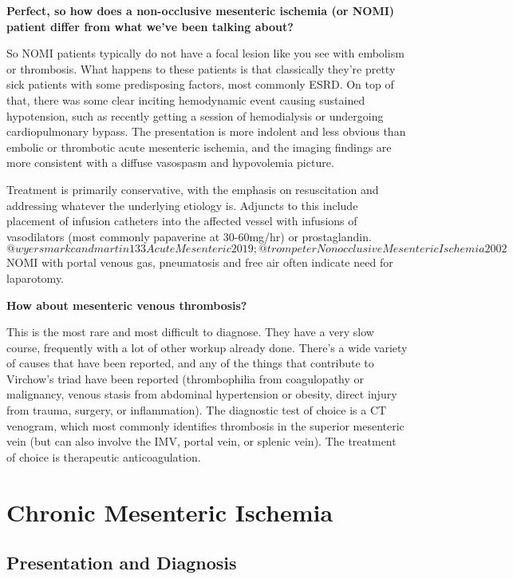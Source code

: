 \documentclass[
]{book}
\begin{document}
\textbf{Perfect, so how does a non-occlusive mesenteric ischemia (or NOMI)
patient differ from what we've been talking about?}

So NOMI patients typically do not have a focal lesion like you see with
embolism or thrombosis. What happens to these patients is that
classically they're pretty sick patients with some predisposing factors,
most commonly ESRD. On top of that, there was some clear inciting
hemodynamic event causing sustained hypotension, such as recently
getting a session of hemodialysis or undergoing cardiopulmonary bypass.
The presentation is more indolent and less obvious than embolic or
thrombotic acute mesenteric ischemia, and the imaging findings are more
consistent with a diffuse vasospasm and hypovolemia picture.

Treatment is primarily conservative, with the emphasis on resuscitation
and addressing whatever the underlying etiology is. Adjuncts to this
include placement of infusion catheters into the affected vessel with
infusions of vasodilators (most commonly papaverine at 30-60mg/hr) or
prostaglandin.\[@wyersmarkcandmartin133AcuteMesenteric2019;
@trompeterNonocclusiveMesentericIschemia2002\] NOMI with portal venous
gas, pneumatosis and free air often indicate need for laparotomy.

\textbf{How about mesenteric venous thrombosis?}

This is the most rare and most difficult to diagnose. They have a very
slow course, frequently with a lot of other workup already done. There's
a wide variety of causes that have been reported, and any of the things
that contribute to Virchow's triad have been reported (thrombophilia
from coagulopathy or malignancy, venous stasis from abdominal
hypertension or obesity, direct injury from trauma, surgery, or
inflammation). The diagnostic test of choice is a CT venogram, which
most commonly identifies thrombosis in the superior mesenteric vein (but
can also involve the IMV, portal vein, or splenic vein). The treatment
of choice is therapeutic anticoagulation.

\hypertarget{chronic-mesenteric-ischemia}{%
\section{Chronic Mesenteric Ischemia}\label{chronic-mesenteric-ischemia}}

\hypertarget{presentation-and-diagnosis-2}{%
\subsection{Presentation and Diagnosis}\label{presentation-and-diagnosis-2}}
\end{document}
